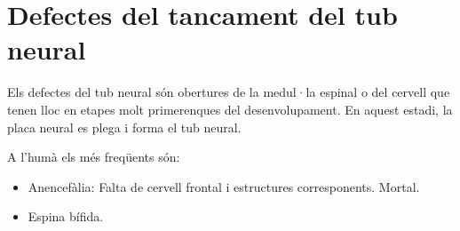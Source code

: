 \section{Defectes del tancament del tub neural}
\label{sec:defect-del-tanc}

Els defectes del tub neural són obertures de la medul·la espinal o del
cervell que tenen lloc en etapes molt primerenques del
desenvolupament. En aquest estadi, la placa neural es plega i forma el
tub neural.

A l'humà els més freqüents són:
\begin{itemize}
\item Anencefàlia: Falta de cervell frontal i estructures
  corresponents. Mortal.
\item Espina bífida.
\end{itemize}

